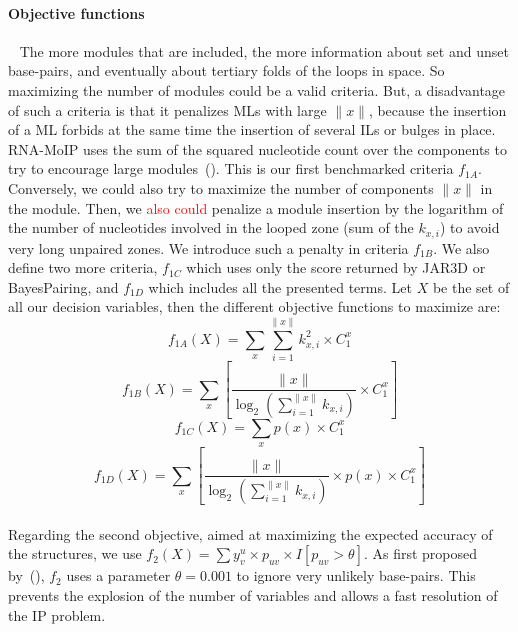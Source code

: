 \documentclass{bioinfo}
\begin{document}
\begin{methods}
\paragraph{Objective functions} ~ The more modules that are included, the more information about set and unset base-pairs, and eventually about tertiary folds of the loops in space. 
So maximizing the number of modules could be a valid criteria. But, a disadvantage of such a criteria is that it penalizes MLs with large $\|x\|$, because the insertion of a ML forbids at the same time the insertion of several ILs or bulges in place. 
RNA-MoIP uses the sum of the squared nucleotide count over the components to try to encourage large modules~(\citealp{reinharz_towards_2012}). This is our first benchmarked criteria $f_{1A}$. 
Conversely, we could also try to maximize the number of components $\|x\|$ in the module. 
Then, we \textcolor{red}{also could} penalize a module insertion by the logarithm of the number of nucleotides involved in the looped zone (sum of the $k_{x,i}$) to avoid very long unpaired zones. 
We introduce such a penalty in criteria $f_{1B}$. We also define two more criteria, $f_{1C}$ which uses only the score returned by JAR3D or BayesPairing, and $f_{1D}$ which includes all the presented terms. 
Let $X$ be the set of all our decision variables, then the different objective functions to maximize are:
\begin{equation}f_{1A}(X) = \sum_{x} \sum_{i=1}^{\|x\|} k_{x,i}^2 \times C^x_1\label{eq:A}\end{equation}
\begin{equation}f_{1B}(X) = \sum_{x} \left[ \frac{\|x\|}{\log_2(\sum_{i=1}^{\|x\|}k_{x,i})} \times C^x_1 \right] \label{eq:B}\end{equation}
\begin{equation}f_{1C}(X) = \sum_{x} p(x) \times C^x_1 \label{eq:C}\end{equation}
\begin{equation}f_{1D}(X) = \sum_{x} \left[ \frac{\|x\|}{\log_2(\sum_{i=1}^{\|x\|}k_{x,i})} \times p(x) \times C^x_1 \right]\label{eq:D}\end{equation} \\
Regarding the second objective, aimed at maximizing the expected accuracy of the structures, we use $f_2(X) = \sum y^u_v \times p_{uv} \times I[p_{uv}>\theta]$. As first proposed by~(\citealp{sato_ipknot:_2011}), $f_2$ uses a parameter $\theta = 0.001$ to ignore very unlikely base-pairs. This prevents the explosion of the number of variables and allows a fast resolution of the IP problem.


\end{methods}
\end{document}
